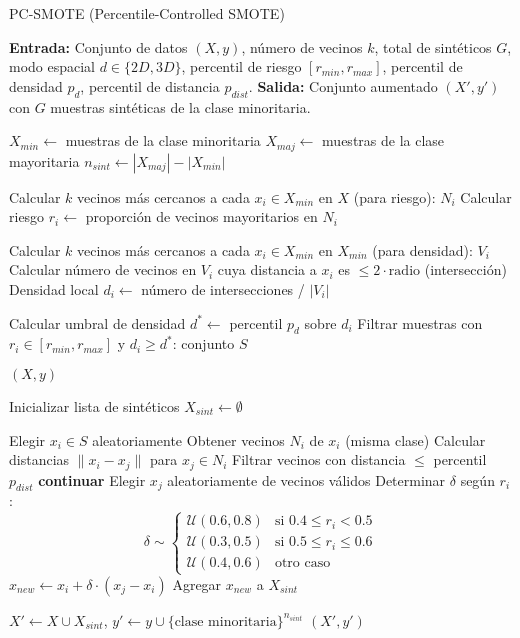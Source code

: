 \begin{algorithm}
\caption{PC-SMOTE (Percentile-Controlled SMOTE)}
\begin{algorithmic}[1]
\State \textbf{Entrada:} Conjunto de datos $(X, y)$, número de vecinos $k$, total de sintéticos $G$, modo espacial $d \in \{2D, 3D\}$, percentil de riesgo $[r_{min}, r_{max}]$, percentil de densidad $p_d$, percentil de distancia $p_{dist}$.
\State \textbf{Salida:} Conjunto aumentado $(X', y')$ con $G$ muestras sintéticas de la clase minoritaria.

\State $X_{min} \gets$ muestras de la clase minoritaria
\State $X_{maj} \gets$ muestras de la clase mayoritaria
\State $n_{sint} \gets |X_{maj}| - |X_{min}|$

\State Calcular $k$ vecinos más cercanos a cada $x_i \in X_{min}$ en $X$ (para riesgo): $N_i$
\State Calcular riesgo $r_i \gets$ proporción de vecinos mayoritarios en $N_i$

\State Calcular $k$ vecinos más cercanos a cada $x_i \in X_{min}$ en $X_{min}$ (para densidad): $V_i$
    \State Calcular número de vecinos en $V_i$ cuya distancia a $x_i$ es $\leq 2 \cdot \text{radio}$ (intersección)
    \State Densidad local $d_i \gets$ número de intersecciones / $|V_i|$
\EndFor

\State Calcular umbral de densidad $d^* \gets$ percentil $p_d$ sobre $d_i$
\State Filtrar muestras con $r_i \in [r_{min}, r_{max}]$ y $d_i \geq d^*$: conjunto $S$

    \State \Return $(X, y)$ 
\EndIf

\State Inicializar lista de sintéticos $X_{sint} \gets \emptyset$

    \State Elegir $x_i \in S$ aleatoriamente
    \State Obtener vecinos $N_i$ de $x_i$ (misma clase)
    \State Calcular distancias $\|x_i - x_j\|$ para $x_j \in N_i$
    \State Filtrar vecinos con distancia $\leq$ percentil $p_{dist}$
        \State \textbf{continuar}
    \EndIf
    \State Elegir $x_j$ aleatoriamente de vecinos válidos
    \State Determinar $\delta$ según $r_i$:
        \[
        \delta \sim 
        \begin{cases}
            \mathcal{U}(0.6, 0.8) & \text{si } 0.4 \leq r_i < 0.5 \\
            \mathcal{U}(0.3, 0.5) & \text{si } 0.5 \leq r_i \leq 0.6 \\
            \mathcal{U}(0.4, 0.6) & \text{otro caso}
        \end{cases}
        \]
    \State $x_{new} \gets x_i + \delta \cdot (x_j - x_i)$
    \State Agregar $x_{new}$ a $X_{sint}$
\EndWhile

\State $X' \gets X \cup X_{sint}$, $y' \gets y \cup \{\text{clase minoritaria}\}^{n_{sint}}$
\State \Return $(X', y')$

\end{algorithmic}
\end{algorithm}
